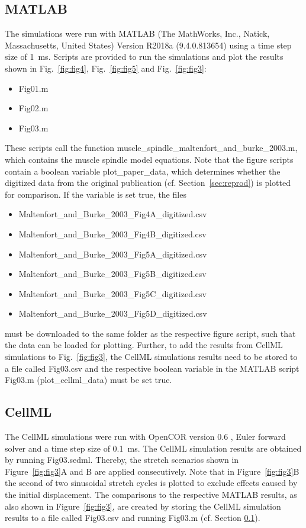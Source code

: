 \documentclass[fleqn,10pt]{physiome}
\begin{document}
\subsection{MATLAB}\label{sec:run_matlab}
The simulations were run with MATLAB (The
MathWorks, Inc., Natick, Massachusetts, United States) Version R2018a (9.4.0.813654) using a time step size of \SI{1}{\milli\second}. 
Scripts are provided to run the simulations and plot the results shown in Fig.~\ref{fig:fig4}, Fig.~\ref{fig:fig5} and Fig.~\ref{fig:fig3}:
\begin{itemize}
    \item[]Fig01.m
    \item[]Fig02.m
    \item[]Fig03.m
\end{itemize}
These scripts call the function {muscle\_spindle\_maltenfort\_and\_burke\_2003.m}, which contains the muscle spindle model equations. 
Note that the figure scripts contain a boolean variable plot\_paper\_data, which determines whether the digitized data from the original publication (cf. Section~\ref{sec:reprod}) is plotted for comparison. If the variable is set true, the files 
\begin{itemize}
    \item[] Maltenfort\_and\_Burke\_2003\_Fig4A\_digitized.csv
    \item[] Maltenfort\_and\_Burke\_2003\_Fig4B\_digitized.csv
    \item[] Maltenfort\_and\_Burke\_2003\_Fig5A\_digitized.csv
    \item[] Maltenfort\_and\_Burke\_2003\_Fig5B\_digitized.csv
    \item[] Maltenfort\_and\_Burke\_2003\_Fig5C\_digitized.csv
    \item[] Maltenfort\_and\_Burke\_2003\_Fig5D\_digitized.csv
\end{itemize}
must be downloaded to the same folder as the respective figure script, such that the data can be loaded for plotting. 
Further, to add the results from CellML simulations to Fig.~\ref{fig:fig3}, the CellML simulations results need to be stored to a file called Fig03.csv and the respective boolean variable in the MATLAB script Fig03.m (plot\_cellml\_data) must be set true.  

\subsection{CellML}
The CellML simulations were run with OpenCOR version 0.6 \citep{opencor}, Euler forward solver and a time step size of \SI{0.1}{\milli\second}.
The CellML simulation results are obtained by running Fig03.sedml. 
Thereby, the stretch scenarios shown in Figure~\ref{fig:fig3}A and B are applied consecutively.
Note that in  Figure~\ref{fig:fig3}B the second of two sinusoidal stretch cycles is plotted to exclude effects caused by the initial displacement. 
The comparisons to the respective MATLAB results, as also shown in Figure~\ref{fig:fig3}, are created by storing the CellML simulation results to a file called Fig03.csv and running Fig03.m (cf. Section \ref{sec:run_matlab}). 
\end{document}
